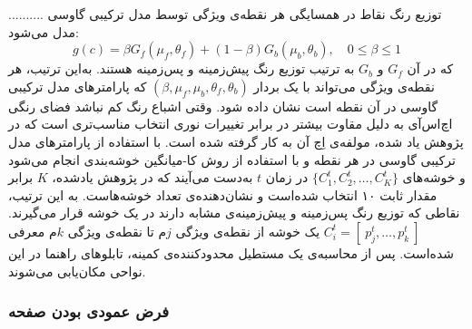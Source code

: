 \documentclass[oneside,openany,msc]{SBU-Thesis}
\begin{document}
	..........
	توزیع رنگ نقاط در همسایگی هر نقطه‌ی ویژگی توسط مدل ترکیبی گاوسی مدل می‌شود:
	\begin{equation}
	g(c) = \beta G_f(\mu_f , \theta_f) + (1 - \beta)G_b(\mu_b , \theta_b), \quad 0 \le \beta \le 1
	\label{eq:GMM}
	\end{equation}
	که در آن $G_f$ و $G_b$ به ترتیب توزیع رنگ پیش‌زمینه و پس‌زمینه هستند. به‌این ترتیب، هر نقطه‌ی ویژگی می‌تواند با یک بردار 
	$(\beta , \mu_f , \mu_b , \theta_f , \theta_b)$
	که پارامترهای مدل ترکیبی گاوسی در آن نقطه‌ است نشان داده شود. وقتی اشباع رنگ کم نباشد فضای رنگی اچ‌اس‌آی به دلیل مقاوت بیشتر در برابر تغییرات نوری انتخاب مناسب‌تری است که در پژوهش‌ یاد شده، مولفه‌ی اِچ آن به کار گرفته شده‌ است. با استفاده از پارامترهای مدل ترکیبی گاوسی در هر نقطه و با استفاده از روش کا-میانگین خوشه‌بندی انجام می‌شود و خوشه‌های
	$\lbrace C_1^t , C_2^t , \dots , C_K^t \rbrace$
	در زمان $t$ به‌دست می‌آیند که در پژوهش یادشده، $K$ برابر مقدار ثابت ۱۰ انتخاب شده‌است و نشان‌دهنده‌ی تعداد خوشه‌هاست. به این ترتیب، نقاطی که توزیع رنگ پس‌زمینه و پیش‌زمینه‌ی مشابه دارند در یک خوشه قرار می‌گیرند. 
	$C_i^t = \left[ \ p_j^t , \dots , p_k^t \ \right] $
	یک خوشه از نقطه‌ی ویژگی $j$م تا نقطه‌ی ویژگی $k$م معرفی شده‌است. پس از محاسبه‌ی یک مستطیل محدود‌کننده‌ی کمینه، تابلوهای راهنما در این نواحی مکان‌یابی می‌شوند. 
	
	
	
	
	\subsubsection{فرض عمودی بودن صفحه}
	
\end{document}
